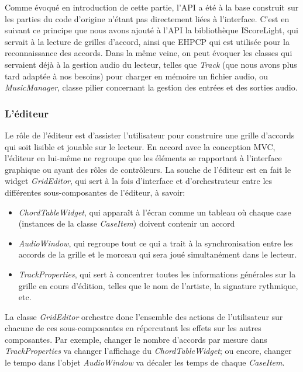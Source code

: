 Comme évoqué en introduction de cette partie, l'API a été à la base construit sur les parties du code d'origine n'étant pas directement liées à l'interface. C'est en suivant ce principe que nous avons ajouté à l'API la bibliothèque IScoreLight, qui servait à la lecture de grilles d'accord, ainsi que EHPCP qui est utilisée pour la reconnaissance des accords. Dans la même veine, on peut évoquer les classes qui servaient déjà à la gestion audio du lecteur, telles que \textit{Track} (que nous avons plus tard adaptée à nos besoins) pour charger en mémoire un fichier audio, ou \textit{MusicManager}, classe pilier concernant la gestion des entrées et des sorties audio.

\subsubsection{L'éditeur}

Le rôle de l'éditeur est d'assister l'utilisateur pour construire une grille d'accords qui soit lisible et jouable sur le lecteur. En accord avec la conception MVC, l'éditeur en lui-même ne regroupe que les éléments se rapportant à l'interface graphique ou ayant des rôles de contrôleurs. La souche de l'éditeur est en fait le widget \textit{GridEditor}, qui sert à la fois d'interface et d'orchestrateur entre les différentes sous-composantes de l'éditeur, à savoir:
\begin{itemize}
 \item \textit{ChordTableWidget}, qui apparaît à l'écran comme un tableau où chaque case (instances de la classe \textit{CaseItem}) doivent contenir un accord
 \item \textit{AudioWindow}, qui regroupe tout ce qui a trait à la synchronisation entre les accords de la grille et le morceau qui sera joué simultanément dans le lecteur.
 \item \textit{TrackProperties}, qui sert à concentrer toutes les informations générales sur la grille en cours d'édition, telles que le nom de l'artiste, la signature rythmique, etc.
\end{itemize}

La classe \textit{GridEditor} orchestre donc l'ensemble des actions de l'utilisateur sur chacune de ces sous-composantes en répercutant les effets sur les autres composantes. Par exemple, changer le nombre d'accords par mesure dans \textit{TrackProperties} va changer l'affichage du \textit{ChordTableWidget}; ou encore, changer le tempo dans l'objet \textit{AudioWindow} va décaler les temps de chaque \textit{CaseItem}.


